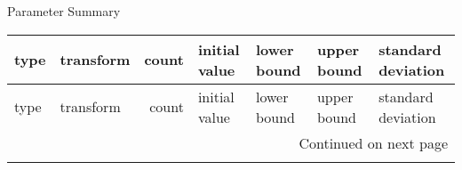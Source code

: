 \documentclass{article}
\begin{document}
\begin{center}
Parameter Summary
\end{center}
\begin{center}
\begin{landscape}
\begin{longtable}{llrllll}
\toprule
               type & transform &  count &  initial value &         lower bound &        upper bound & standard deviation \\
\midrule
\endfirsthead

\toprule
               type & transform &  count &  initial value &         lower bound &        upper bound & standard deviation \\
\midrule
\endhead
\midrule
\multicolumn{7}{r}{{Continued on next page}} \\
\midrule
\endfoot


\end{longtable}
\end{landscape}
\end{center}
\end{document}
